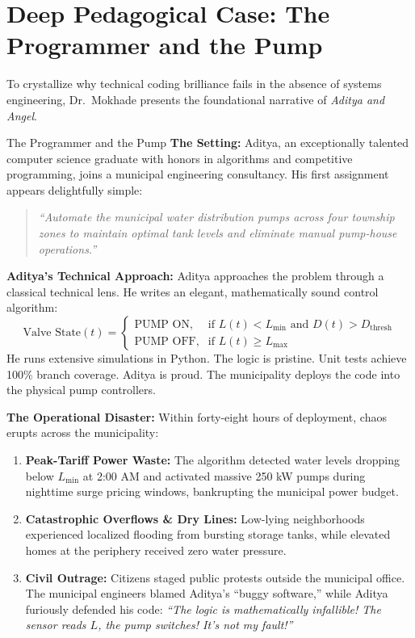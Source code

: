 \section{Deep Pedagogical Case: The Programmer and the Pump}
\label{sec:programmer_pump}

To crystallize why technical coding brilliance fails in the absence of systems engineering, Dr.~Mokhade presents the foundational narrative of \textit{Aditya and Angel}.

\begin{storybox}{The Programmer and the Pump}
\textbf{The Setting:} Aditya, an exceptionally talented computer science graduate with honors in algorithms and competitive programming, joins a municipal engineering consultancy. His first assignment appears delightfully simple:
\begin{quote}
\textit{``Automate the municipal water distribution pumps across four township zones to maintain optimal tank levels and eliminate manual pump-house operations.''}
\end{quote}

\textbf{Aditya's Technical Approach:}
Aditya approaches the problem through a classical technical lens. He writes an elegant, mathematically sound control algorithm:
\begin{equation}
    \text{Valve State}(t) = \begin{cases}
    \text{PUMP ON}, & \text{if } L(t) < L_{\text{min}} \text{ and } D(t) > D_{\text{thresh}} \\
    \text{PUMP OFF}, & \text{if } L(t) \ge L_{\text{max}}
    \end{cases}
\end{equation}
He runs extensive simulations in Python. The logic is pristine. Unit tests achieve 100\% branch coverage. Aditya is proud. The municipality deploys the code into the physical pump controllers.

\textbf{The Operational Disaster:}
Within forty-eight hours of deployment, chaos erupts across the municipality:
\begin{enumerate}[leftmargin=1.5em]
    \item \textbf{Peak-Tariff Power Waste:} The algorithm detected water levels dropping below $L_{\text{min}}$ at 2:00 AM and activated massive 250 kW pumps during nighttime surge pricing windows, bankrupting the municipal power budget.
    \item \textbf{Catastrophic Overflows \& Dry Lines:} Low-lying neighborhoods experienced localized flooding from bursting storage tanks, while elevated homes at the periphery received zero water pressure.
    \item \textbf{Civil Outrage:} Citizens staged public protests outside the municipal office. The municipal engineers blamed Aditya's ``buggy software,'' while Aditya furiously defended his code: \textit{``The logic is mathematically infallible! The sensor reads $L$, the pump switches! It's not my fault!''}
\end{enumerate}


\end{storybox}
